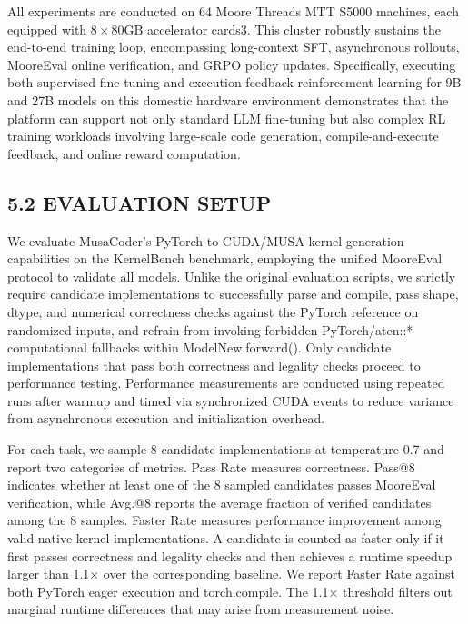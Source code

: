 \documentclass[
  10
]{article}
\begin{document}
All experiments are conducted on 64 Moore Threads MTT S5000 machines,
each equipped with \(8 \times 8 0 \mathrm { G B }\) accelerator cards3.
This cluster robustly sustains the end-to-end training loop,
encompassing long-context SFT, asynchronous rollouts, MooreEval online
verification, and GRPO policy updates. Specifically, executing both
supervised fine-tuning and execution-feedback reinforcement learning for
9B and 27B models on this domestic hardware environment demonstrates
that the platform can support not only standard LLM fine-tuning but also
complex RL training workloads involving large-scale code generation,
compile-and-execute feedback, and online reward computation.

\subsection{5.2 EVALUATION SETUP}\label{evaluation-setup}

We evaluate MusaCoder's PyTorch-to-CUDA/MUSA kernel generation
capabilities on the KernelBench benchmark, employing the unified
MooreEval protocol to validate all models. Unlike the original
evaluation scripts, we strictly require candidate implementations to
successfully parse and compile, pass shape, dtype, and numerical
correctness checks against the PyTorch reference on randomized inputs,
and refrain from invoking forbidden PyTorch/aten::* computational
fallbacks within ModelNew.forward(). Only candidate implementations that
pass both correctness and legality checks proceed to performance
testing. Performance measurements are conducted using repeated runs
after warmup and timed via synchronized CUDA events to reduce variance
from asynchronous execution and initialization overhead.

For each task, we sample 8 candidate implementations at temperature 0.7
and report two categories of metrics. Pass Rate measures correctness.
Pass@8 indicates whether at least one of the 8 sampled candidates passes
MooreEval verification, while Avg.@8 reports the average fraction of
verified candidates among the 8 samples. Faster Rate measures
performance improvement among valid native kernel implementations. A
candidate is counted as faster only if it first passes correctness and
legality checks and then achieves a runtime speedup larger than 1.1×
over the corresponding baseline. We report Faster Rate against both
PyTorch eager execution and torch.compile. The 1.1× threshold filters
out marginal runtime differences that may arise from measurement noise.
\end{document}
